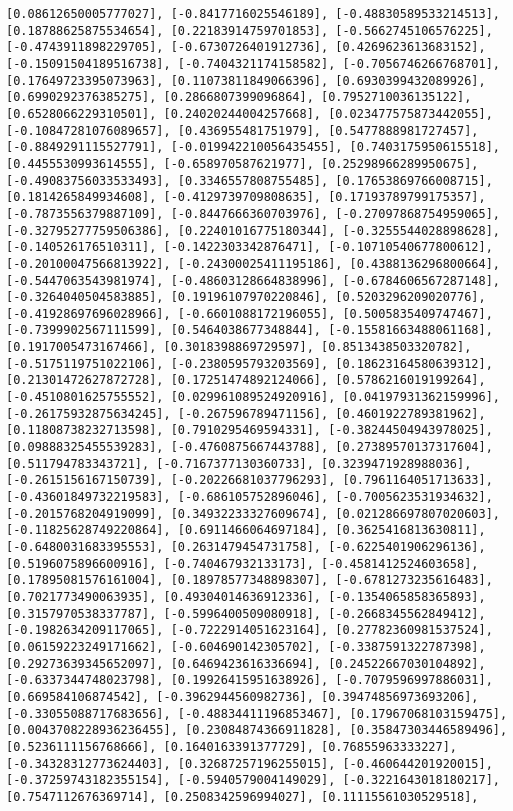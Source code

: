 \documentclass[11pt]{article}
\begin{document}
\begin{Verbatim}[commandchars=\\\{\}]
[0.08612650005777027], [-0.8417716025546189], [-0.48830589533214513], [0.18788625875534654], [0.22183914759701853], [-0.5662745106576225], [-0.4743911898229705], [-0.6730726401912736], [0.4269623613683152], [-0.15091504189516738], [-0.7404321174158582], [-0.7056746266768701], [0.17649723395073963], [0.11073811849066396], [0.6930399432089926], [0.6990292376385275], [0.2866807399096864], [0.7952710036135122], [0.6528066229310501], [0.24020244004257668], [0.023477575873442055], [-0.10847281076089657], [0.436955481751979], [0.5477888981727457], [-0.8849291115527791], [-0.019942210056435455], [0.7403175950615518], [0.4455530993614555], [-0.658970587621977], [0.25298966289950675], [-0.49083756033533493], [0.3346557808755485], [0.17653869766008715], [0.1814265849934608], [-0.4129739709808635], [0.17193789799175357], [-0.7873556379887109], [-0.8447666360703976], [-0.27097868754959065], [-0.32795277759506386], [0.22401016775180344], [-0.3255544028898628], [-0.140526176510311], [-0.1422303342876471], [-0.10710540677800612], [-0.20100047566813922], [-0.24300025411195186], [0.4388136296800664], [-0.5447063543981974], [-0.48603128664838996], [-0.6784606567287148], [-0.3264040504583885], [0.19196107970220846], [0.5203296209020776], [-0.41928697696028966], [-0.6601088172196055], [0.5005835409747467], [-0.7399902567111599], [0.5464038677348844], [-0.15581663488061168], [0.1917005473167466], [0.3018398869729597], [0.8513438503320782], [-0.5175119751022106], [-0.2380595793203569], [0.18623164580639312], [0.21301472627872728], [0.17251474892124066], [0.5786216019199264], [-0.4510801625755552], [0.029961089524920916], [0.04197931362159996], [-0.26175932875634245], [-0.267596789471156], [0.4601922789381962], [0.11808738232713598], [0.7910295469594331], [-0.38244504943978025], [0.09888325455539283], [-0.4760875667443788], [0.27389570137317604], [0.511794783343721], [-0.7167377130360733], [0.3239471928988036], [-0.2615156167150739], [-0.20226681037796293], [0.7961164051713633], [-0.43601849732219583], [-0.686105752896046], [-0.7005623531934632], [-0.2015768204919099], [0.34932233327609674], [0.021286697807020603], [-0.11825628749220864], [0.6911466064697184], [0.3625416813630811], [-0.6480031683395553], [0.2631479454731758], [-0.6225401906296136], [0.5196075896600916], [-0.740467932133173], [-0.4581412524603658], [0.17895081576161004], [0.18978577348898307], [-0.6781273235616483], [0.7021773490063935], [0.49304014636912336], [-0.1354065858365893], [0.3157970538337787], [-0.5996400509080918], [-0.2668345562849412], [-0.1982634209117065], [-0.7222914051623164], [0.27782360981537524], [0.06159223249171662], [-0.604690142305702], [-0.3387591322787398], [0.29273639345652097], [0.6469423616336694], [0.24522667030104892], [-0.6337344748023798], [0.19926415951638926], [-0.7079596997886031], [0.669584106874542], [-0.3962944560982736], [0.39474856973693206], [-0.33055088717683656], [-0.48834411196853467], [0.17967068103159475], [0.0043708228936236455], [0.23084874366911828], [0.35847303446589496], [0.5236111156768666], [0.1640163391377729], [0.76855963333227], [-0.34328312773624403], [0.32687257196255015], [-0.460644201920015], [-0.37259743182355154], [-0.5940579004149029], [-0.3221643018180217], [0.7547112676369714], [0.2508342596994027], [0.11115561030529518], 
\end{Verbatim}
\end{document}
